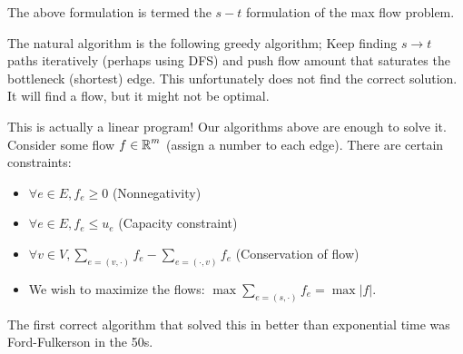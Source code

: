The above formulation is termed the $s-t$ formulation of the max flow problem.

The natural algorithm is the following greedy algorithm; Keep finding $s \to t$ paths iteratively (perhaps using DFS)
and push flow amount that saturates the bottleneck (shortest) edge. This unfortunately does not find the correct solution.
It will find a flow, but it might not be optimal.

This is actually a linear program! Our algorithms above are enough to solve it. Consider some flow $f \in \operatorname{\mathbb{R}}^{m}$ (assign a number to each edge).
There are certain constraints:
\begin{itemize}
    \item $\forall e \in E, f_e \geq 0$ (Nonnegativity)
    \item $\forall e \in E, f_e \leq u_e$ (Capacity constraint)
    \item $\forall v \in V, \sum_{e = (v, \cdot)} f_e - \sum_{e = (\cdot, v)} f_e$ (Conservation of flow)
    \item We wish to maximize the flows: $\max \sum_{e = (s, \cdot)} f_e = \max |f|$.
\end{itemize}

The first correct algorithm that solved this in better than exponential time was Ford-Fulkerson in the 50s.

